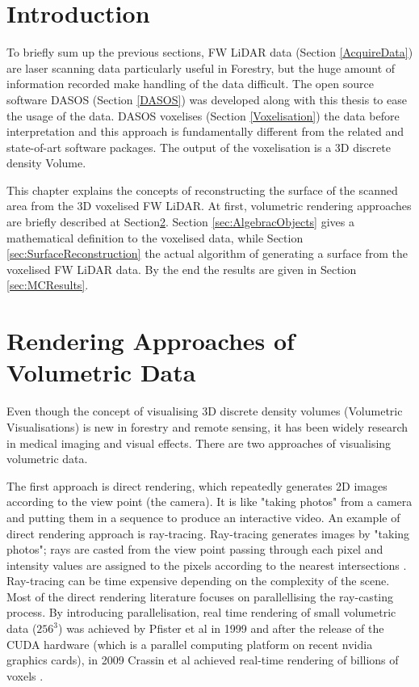 \documentclass{subfiles}
\begin{document}
	

\section{Introduction}


\par To briefly sum up the previous sections, FW LiDAR data (Section \ref{AcquireData}) are laser scanning data particularly useful in Forestry, but the huge amount of information recorded make handling of the data difficult. The open source software DASOS (Section \ref{DASOS}) was developed along with this thesis to ease the usage of the data. DASOS voxelises (Section \ref{Voxelisation}) the data before interpretation and this approach is fundamentally different from the related and state-of-art software packages. The output of the voxelisation is a 3D discrete density Volume. 


\par This chapter explains the concepts of reconstructing the surface of the scanned area from the 3D voxelised FW LiDAR. At first, volumetric rendering approaches are briefly described at Section\ref{sec:RenderingApproaches}. Section \ref{sec:AlgebracObjects} gives a mathematical definition to the voxelised data, while Section \ref{sec:SurfaceReconstruction} the actual algorithm of generating a surface from the voxelised FW LiDAR data. By the end the results are given in Section \ref{sec:MCResults}. 


\section{Rendering Approaches of Volumetric Data}\label{sec:RenderingApproaches}
\par Even though the concept of visualising 3D discrete density volumes (Volumetric Visualisations) is new in forestry and remote sensing, it has been widely research in medical imaging and visual effects. There are two approaches of visualising volumetric data.

\par The first approach is direct rendering, which repeatedly generates 2D images according to the view point (the camera). It is like "taking photos" from a camera and putting them in a sequence to produce an interactive video. An example of direct rendering approach is ray-tracing. Ray-tracing generates images by "taking photos"; rays are casted from the view point passing through each pixel and intensity values are assigned to the pixels according to the nearest intersections \cite{Hanrahan1983}. Ray-tracing can be time expensive depending on the complexity of the scene. Most of the direct rendering literature focuses on parallellising the ray-casting process. By introducing parallelisation, real time rendering of small volumetric data ($256^3$) was achieved by Pfister et al in 1999 \cite{Pfister1999} and after the release of the CUDA hardware (which is a parallel computing platform on recent nvidia graphics cards), in 2009 Crassin et al achieved real-time rendering of billions of voxels \cite{Crassin2009}. 
	
\end{document}
